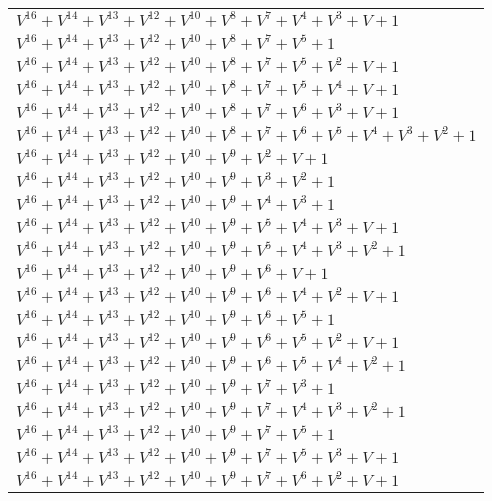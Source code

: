 \documentclass[12pt]{article}
\begin{document}
\begin{adjustwidth}{-4cm}{}
\begin{center}
\begin{longtable}{|l|}
$V^{16}  +V^{14}  +V^{13}  +V^{12}  +V^{10}  +V^{8}  +V^{7}  +V^{4}  +V^{3}  + V + 1$ \\
$V^{16}  +V^{14}  +V^{13}  +V^{12}  +V^{10}  +V^{8}  +V^{7}  +V^{5}  + 1$ \\
$V^{16}  +V^{14}  +V^{13}  +V^{12}  +V^{10}  +V^{8}  +V^{7}  +V^{5}  +V^{2}  + V + 1$ \\
$V^{16}  +V^{14}  +V^{13}  +V^{12}  +V^{10}  +V^{8}  +V^{7}  +V^{5}  +V^{4}  + V + 1$ \\
$V^{16}  +V^{14}  +V^{13}  +V^{12}  +V^{10}  +V^{8}  +V^{7}  +V^{6}  +V^{3}  + V + 1$ \\
$V^{16}  +V^{14}  +V^{13}  +V^{12}  +V^{10}  +V^{8}  +V^{7}  +V^{6}  +V^{5}  +V^{4}  +V^{3}  +V^{2}  + 1$ \\
$V^{16}  +V^{14}  +V^{13}  +V^{12}  +V^{10}  +V^{9}  +V^{2}  + V + 1$ \\
$V^{16}  +V^{14}  +V^{13}  +V^{12}  +V^{10}  +V^{9}  +V^{3}  +V^{2}  + 1$ \\
$V^{16}  +V^{14}  +V^{13}  +V^{12}  +V^{10}  +V^{9}  +V^{4}  +V^{3}  + 1$ \\
$V^{16}  +V^{14}  +V^{13}  +V^{12}  +V^{10}  +V^{9}  +V^{5}  +V^{4}  +V^{3}  + V + 1$ \\
$V^{16}  +V^{14}  +V^{13}  +V^{12}  +V^{10}  +V^{9}  +V^{5}  +V^{4}  +V^{3}  +V^{2}  + 1$ \\
$V^{16}  +V^{14}  +V^{13}  +V^{12}  +V^{10}  +V^{9}  +V^{6}  + V + 1$ \\
$V^{16}  +V^{14}  +V^{13}  +V^{12}  +V^{10}  +V^{9}  +V^{6}  +V^{4}  +V^{2}  + V + 1$ \\
$V^{16}  +V^{14}  +V^{13}  +V^{12}  +V^{10}  +V^{9}  +V^{6}  +V^{5}  + 1$ \\
$V^{16}  +V^{14}  +V^{13}  +V^{12}  +V^{10}  +V^{9}  +V^{6}  +V^{5}  +V^{2}  + V + 1$ \\
$V^{16}  +V^{14}  +V^{13}  +V^{12}  +V^{10}  +V^{9}  +V^{6}  +V^{5}  +V^{4}  +V^{2}  + 1$ \\
$V^{16}  +V^{14}  +V^{13}  +V^{12}  +V^{10}  +V^{9}  +V^{7}  +V^{3}  + 1$ \\
$V^{16}  +V^{14}  +V^{13}  +V^{12}  +V^{10}  +V^{9}  +V^{7}  +V^{4}  +V^{3}  +V^{2}  + 1$ \\
$V^{16}  +V^{14}  +V^{13}  +V^{12}  +V^{10}  +V^{9}  +V^{7}  +V^{5}  + 1$ \\
$V^{16}  +V^{14}  +V^{13}  +V^{12}  +V^{10}  +V^{9}  +V^{7}  +V^{5}  +V^{3}  + V + 1$ \\
$V^{16}  +V^{14}  +V^{13}  +V^{12}  +V^{10}  +V^{9}  +V^{7}  +V^{6}  +V^{2}  + V + 1$ \\

\end{longtable}
\end{center}
\end{adjustwidth}
\end{document}
